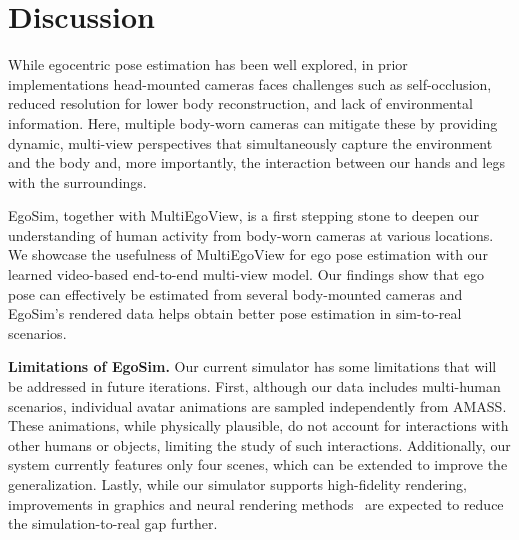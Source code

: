 \section{Discussion}
\label{discussion}

While egocentric pose estimation has been well explored, in prior implementations head-mounted cameras faces challenges such as self-occlusion, reduced resolution for lower body reconstruction, and lack of environmental information.
Here, multiple body-worn cameras can mitigate these by providing dynamic, multi-view perspectives that simultaneously capture the environment and the body and, more importantly, the interaction between our hands and legs with the surroundings.

EgoSim, together with MultiEgoView, is a first stepping stone to deepen our understanding of human activity from body-worn cameras at various locations.
We showcase the usefulness of MultiEgoView for ego pose estimation with our learned video-based end-to-end multi-view model.
Our findings show that ego pose can effectively be estimated from several body-mounted cameras and EgoSim's rendered data helps obtain better pose estimation in sim-to-real scenarios.

\noindent\textbf{Limitations of EgoSim.}
\label{sec:limitations}
Our current simulator has some limitations that will be addressed in future iterations.
First, although our data includes multi-human scenarios, individual avatar animations are sampled independently from AMASS. These animations, while physically plausible, do not account for interactions with other humans or objects, limiting the study of such interactions.
Additionally, our system currently features only four scenes, which can be extended to improve the generalization.
Lastly, while our simulator supports high-fidelity rendering, improvements in graphics and neural rendering methods~\cite{kerbl20233d} are expected to reduce the simulation-to-real gap further.

